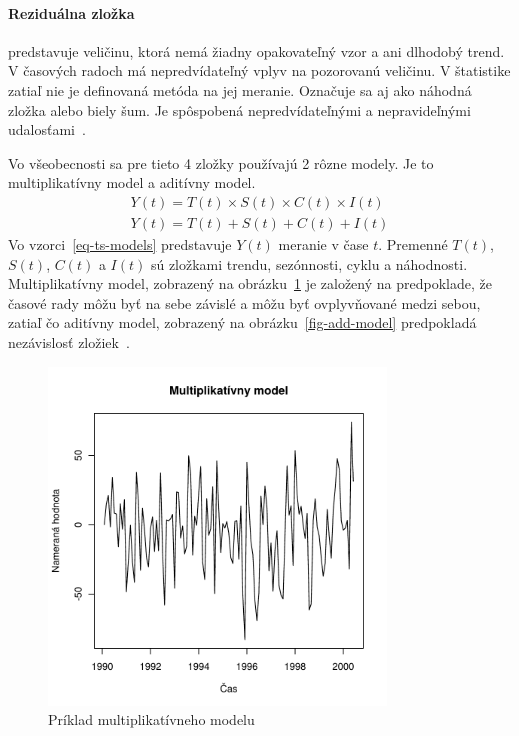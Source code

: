 \documentclass[a4paper,slovak,12pt,appendix]{article}
\begin{document}
\paragraph{Reziduálna zložka} predstavuje veličinu, ktorá nemá žiadny
opakovateľný vzor a ani dlhodobý trend. V časových radoch má nepredvídateľný
vplyv na pozorovanú veličinu. V štatistike zatiaľ nie je definovaná metóda na
jej meranie. Označuje sa aj ako náhodná zložka alebo biely šum. Je spôspobená
nepredvídateľnými a nepravideľnými udalosťami~\cite{Agrawal2013}.

Vo všeobecnosti sa pre tieto 4 zložky používajú 2 rôzne modely. Je to
multiplikatívny model a aditívny model.
\begin{equation}
  \begin{split}
    Y(t) = T(t) \times S(t) \times C(t) \times I(t)
    \\
    Y(t) = T(t) + S(t) + C(t) + I(t)
  \end{split}
  \label{eq-ts-models}
\end{equation}
Vo vzorci~\ref{eq-ts-models} predstavuje $Y(t)$ meranie v čase $t$. Premenné
$T(t)$, $S(t)$, $C(t)$ a $I(t)$ sú zložkami trendu, sezónnosti,
cyklu a náhodnosti. Multiplikatívny model, zobrazený na
obrázku~\ref{fig-multi-model} je založený na predpoklade, že časové rady môžu
byť na sebe závislé a môžu byť ovplyvňované medzi sebou, zatiaľ čo aditívny
model, zobrazený na obrázku~\ref{fig-add-model} predpokladá nezávislosť
zložiek~\cite{Agrawal2013}.

\begin{figure}[!ht]
  \centering
  \includegraphics[width=0.8\textwidth]{multi_model.pdf}
  \caption{Príklad multiplikatívneho modelu}
  \label{fig-multi-model}
\end{figure}
\end{document}
